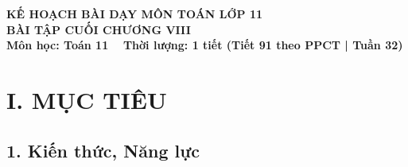\documentclass[12pt, a4paper]{article}
\begin{document}
\begin{center}
    {\fontsize{14pt}{17pt}\selectfont \textbf{KẾ HOẠCH BÀI DẠY MÔN TOÁN LỚP 11}}\\[6pt]
    {\fontsize{16pt}{19pt}\selectfont \textbf{BÀI TẬP CUỐI CHƯƠNG VIII}}\\[4pt]
    {\fontsize{12pt}{15pt}\selectfont \textbf{Môn học: Toán 11} \ \textbar \ \textbf{Thời lượng: 1 tiết (Tiết 91 theo PPCT | Tuần 32)}}
\end{center}

\vspace{5pt}

\section*{I. MỤC TIÊU}

\subsection*{1. Kiến thức, Năng lực}
\end{document}
